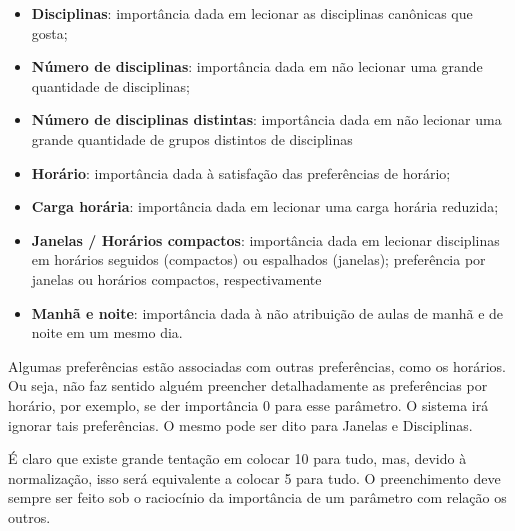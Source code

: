 \documentclass[a4paper, 12pt]{report}
\begin{document}
\begin{itemize}
\item \textbf{Disciplinas}: importância dada em lecionar as
  disciplinas canônicas que gosta;
\item \textbf{Número de disciplinas}: importância dada em não lecionar
  uma grande quantidade de disciplinas;
\item \textbf{Número de disciplinas distintas}: importância dada em
  não lecionar uma grande quantidade de grupos distintos de
  disciplinas
\item \textbf{Horário}: importância dada à satisfação das preferências
  de horário;
\item \textbf{Carga horária}: importância dada em lecionar uma carga
  horária reduzida;
\item \textbf{Janelas / Horários compactos}: importância dada em
  lecionar disciplinas em horários seguidos (compactos) ou espalhados
  (janelas); preferência por janelas ou horários compactos,
  respectivamente
\item \textbf{Manhã e noite}: importância dada à não atribuição de
  aulas de manhã e de noite em um mesmo dia.
\end{itemize}

Algumas preferências estão associadas com outras preferências, como os
horários. Ou seja, não faz sentido alguém preencher detalhadamente as
preferências por horário, por exemplo, se der importância 0 para esse
parâmetro. O sistema irá ignorar tais preferências. O mesmo pode ser
dito para Janelas e Disciplinas.

É claro que existe grande tentação em colocar 10 para tudo, mas,
devido à normalização, isso será equivalente a colocar 5 para tudo. O
preenchimento deve sempre ser feito sob o raciocínio da importância de
um parâmetro com relação os outros.
\end{document}
